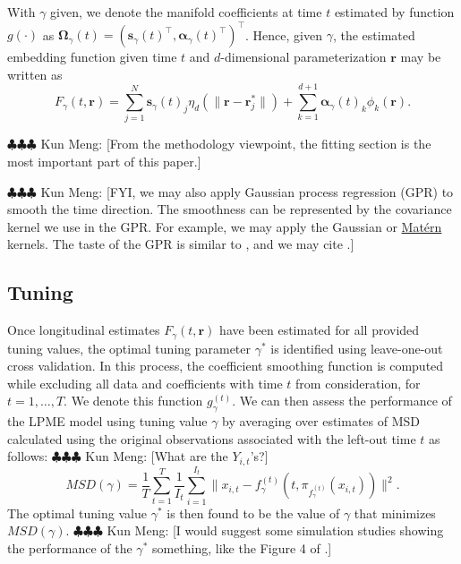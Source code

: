 \documentclass[11pt,reqno]{article}
\newcommand{\T}{\intercal}
\newcommand{\meng}[1]{{\color{purple} \sf $\clubsuit\clubsuit\clubsuit$ Kun Meng: [#1]}}
\theoremstyle{definition}
\begin{document}
With $\gamma$ given, we denote the manifold coefficients at time $t$ estimated by function $g(\cdot)$ as $\boldsymbol{\Omega}_{\gamma}(t) = \left(\boldsymbol{s}_{\gamma}(t)^\T, \boldsymbol{\alpha}_{\gamma}(t)^\T\right)^\T$. Hence, given $\gamma$, the estimated embedding function given time $t$ and $d$-dimensional parameterization $\boldsymbol{r}$ may be written as
\begin{equation}
  F_{\gamma}(t, \boldsymbol{r}) = \sum_{j=1}^{N}\boldsymbol{s}_{\gamma}(t)_j \eta_{d}\left(\|\boldsymbol{r} - \boldsymbol{r}_j^*\|\right) + \sum_{k=1}^{d+1}\boldsymbol{\alpha}_{\gamma}(t)_k \phi_k(\boldsymbol{r}). \label{eq:17}
\end{equation}

\meng{From the methodology viewpoint, the fitting section is the most important part of this paper.}

\meng{FYI, we may also apply Gaussian process regression (GPR) to smooth the time direction. The smoothness can be represented by the covariance kernel we use in the GPR. For example, we may apply the Gaussian or \href{https://en.wikipedia.org/wiki/Matern_covariance_function}{Matérn} kernels. The taste of the GPR is similar to \cite{dunsonInferringManifoldsNoisy2022}, and we may cite \cite{dunsonInferringManifoldsNoisy2022}.}

\subsection*{Tuning}

Once longitudinal estimates $F_{\gamma}(t, \boldsymbol{r})$ have been estimated for all provided tuning values, the optimal tuning parameter $\gamma^*$ is identified using leave-one-out cross validation. In this process, the coefficient smoothing function is computed while excluding all data and coefficients with time $t$ from consideration, for $t = 1, \dots, T$. We denote this function $g_{\gamma}^{(t)}$. We can then assess the performance of the LPME model using tuning value $\gamma$ by averaging over estimates of MSD calculated using the original observations associated with the left-out time $t$ as follows: \meng{What are the $Y_{i,t}$'s?}
\begin{equation}
  MSD(\gamma) = \frac{1}{T} \sum_{t=1}^{T}\frac{1}{I_t}\sum_{i=1}^{I_t}\|x_{i, t} - f_{\gamma}^{(t)}(t, \pi_{f_{\gamma}^{(t)}}(x_{i, t}))\|^2. \label{eq:18}
\end{equation}
The optimal tuning value $\gamma^*$ is then found to be the value of $\gamma$ that minimizes $MSD(\gamma)$. \meng{I would suggest some simulation studies showing the performance of the $\gamma^*$ something, like the Figure 4 of \cite{mengPrincipalManifoldEstimation2021}.}
\end{document}
